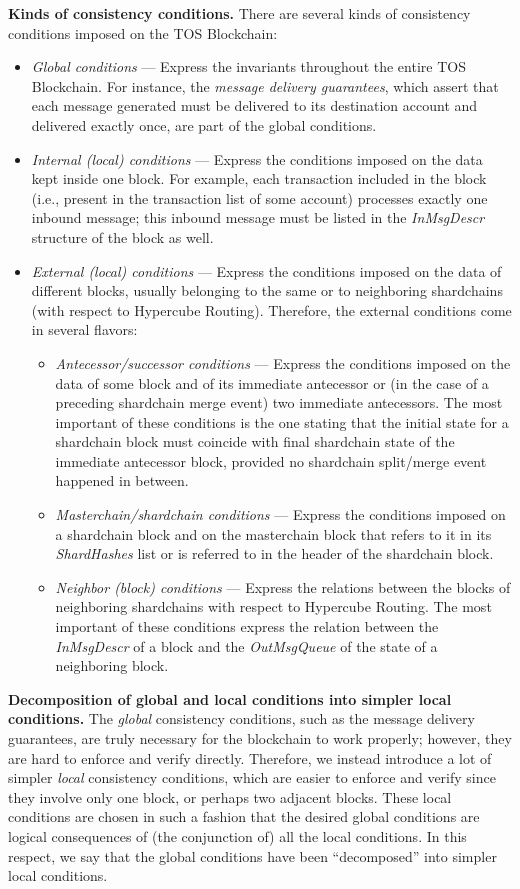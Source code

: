 \documentclass[12pt,oneside]{article}
\def\makepoint#1{\medbreak\noindent{\bf #1.\ }}
\def\nxsubpoint{\refstepcounter{subsubsection}%
  \smallbreak\makepoint{\thesubsubsection}}
\def\emb#1{\textbf{#1.}}
\begin{document}
\nxsubpoint\emb{Kinds of consistency conditions}
There are several kinds of consistency conditions imposed on the TOS Blockchain:
\begin{itemize}
\item {\em Global conditions} --- Express the invariants throughout the entire TOS Blockchain. For instance, the {\em message delivery guarantees}, which assert that each message generated must be delivered to its destination account and delivered exactly once, are part of the global conditions.
\item {\em Internal (local) conditions} --- Express the conditions imposed on the data kept inside one block. For example, each transaction included in the block (i.e., present in the transaction list of some account) processes exactly one inbound message; this inbound message must be listed in the {\em InMsgDescr\/} structure of the block as well.
\item {\em External (local) conditions} --- Express the conditions imposed on the data of different blocks, usually belonging to the same or to neighboring shardchains (with respect to Hypercube Routing). Therefore, the external conditions come in several flavors:
  \begin{itemize}
  \item {\em Antecessor/successor conditions} --- Express the conditions imposed on the data of some block and of its immediate antecessor or (in the case of a preceding shardchain merge event) two immediate antecessors. The most important of these conditions is the one stating that the initial state for a shardchain block must coincide with final shardchain state of the immediate antecessor block, provided no shardchain split/merge event happened in between.
  \item {\em Masterchain/shardchain conditions} --- Express the conditions imposed on a shardchain block and on the masterchain block that refers to it in its {\em ShardHashes\/} list or is referred to in the header of the shardchain block.
  \item {\em Neighbor (block) conditions} --- Express the relations between the blocks of neighboring shardchains with respect to Hypercube Routing. The most important of these conditions express the relation between the {\em InMsgDescr\/} of a block and the {\em OutMsgQueue\/} of the state of a neighboring block.
  \end{itemize}
\end{itemize}

\nxsubpoint\emb{Decomposition of global and local conditions into simpler local conditions}
The {\em global\/} consistency conditions, such as the message delivery guarantees, are truly necessary for the blockchain to work properly; however, they are hard to enforce and verify directly. Therefore, we instead introduce a lot of simpler {\em local\/} consistency conditions, which are easier to enforce and verify since they involve only one block, or perhaps two adjacent blocks. These local conditions are chosen in such a fashion that the desired global conditions are logical consequences of (the conjunction of) all the local conditions. In this respect, we say that the global conditions have been ``decomposed'' into simpler local conditions.
\end{document}
